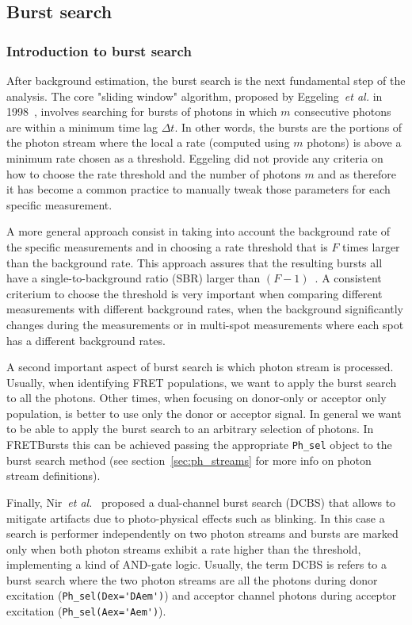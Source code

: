 \subsection{Burst search}
\label{sec:burstsearch}

\subsubsection{Introduction to burst search}
After background estimation, the burst search is the next fundamental step of the analysis. The core "sliding window" algorithm, proposed by Eggeling~\textit{et al.} in 1998~\cite{Eggeling_1998}, involves searching for bursts of photons
in which $m$ consecutive photons are within a minimum time lag $\Delta t$. In other words, the bursts are the portions of the photon stream where the local a rate (computed using $m$ photons) is above a minimum rate chosen as a threshold. Eggeling did not provide any criteria on how to choose the rate threshold and the number of photons $m$ and as therefore it has become a common practice to manually tweak those parameters for each specific measurement. 

A more general approach consist in taking into account the background rate of the specific measurements and in choosing a rate threshold that is $F$ times larger than the background rate. This approach assures that the resulting bursts all have a single-to-background ratio (SBR) larger than $(F-1)$~\cite{Michalet_2012}. A consistent criterium to choose the threshold is very important when comparing different measurements with different background rates, when the background significantly changes during the measurements or in multi-spot measurements where each spot has a different background rates.

A second important aspect of burst search is which photon stream is processed. Usually, when identifying FRET populations, we want to apply the burst search to all the photons. Other times, when focusing on donor-only or acceptor only population, is better to use only the donor or acceptor signal. In general we want to be able to apply the burst search to an arbitrary selection of photons. In FRETBursts this can be achieved passing the appropriate \verb|Ph_sel| object to the burst search method (see section~\ref{sec:ph_streams} for more info on photon stream definitions).

Finally, Nir~\textit{et al.}~\cite{Nir_2006} proposed a dual-channel burst search (DCBS) that allows to mitigate artifacts due to photo-physical effects such as blinking. In this case a search is performer independently on two photon streams and bursts are marked only when both photon streams exhibit a rate higher than the threshold, 
implementing a kind of AND-gate logic. 
Usually, the term DCBS is refers to a burst search where the two photon streams are all the photons 
during donor excitation (\verb|Ph_sel(Dex='DAem')|) and acceptor channel photons during acceptor 
excitation (\verb|Ph_sel(Aex='Aem')|).

